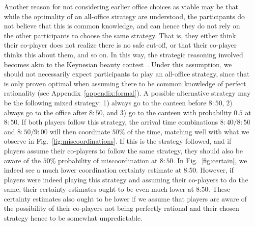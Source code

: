 Another reason for not considering earlier office choices as viable may be that while the optimality of an all-office strategy are understood, the participants do not believe that this is common knowledge, and can hence they do not rely on the other participants to choose the same strategy. That is, they either think their co-player does not realize there is no safe cut-off, or that their co-player thinks this about them, and so on. In this way, the strategic reasoning involved becomes akin to the Keynesian beauty contest~\cite{keynes1936general,nagel1995unraveling}. Under this assumption, we should not necessarily expect participants to play an all-office strategy, since that is only proven optimal when assuming there to be common knowledge of perfect rationality (see Appendix~\ref{appendix:formal}). A possible alternative strategy may be the following mixed strategy: 1) always go to the canteen before $8{:}50$, 2) always go to the office after $8{:}50$, and 3) go to the canteen with probability $0.5$ at $8{:}50$. If both players follow this strategy, the arrival time combinations $8{:}40/8{:}50$ and $8{:}50/9{:}00$ will then coordinate $50\%$ of the time, matching well with what we observe in Fig.~\ref{fig:miscoordinations}. If this is the strategy followed, and if players assume their co-players to follow the same strategy, they should also be aware of the $50\%$ probability of miscoordination at $8{:}50$. In Fig.~\ref{fig:certain}, we indeed see a much lower coordination certainty estimate at 8:50. However, if players were indeed playing this strategy and assuming their co-players to do the same, their certainty estimates ought to be even much lower at 8{:}50. %
 These certainty estimates also ought to be lower if we assume that players are aware of the possibility of their co-players not being perfectly rational and their chosen strategy hence to be somewhat unpredictable. 


